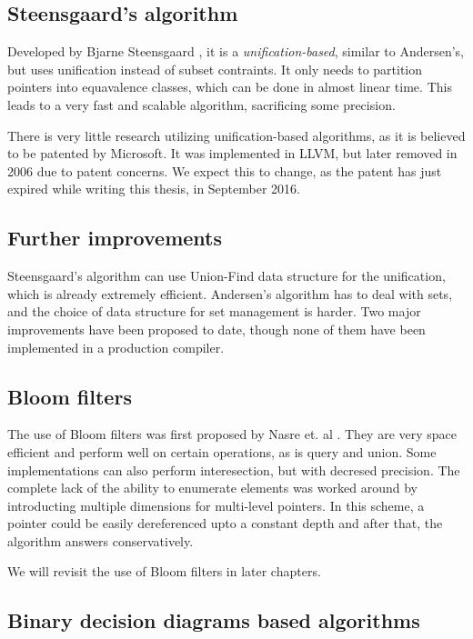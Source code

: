 \subsection{Steensgaard's algorithm}

Developed by Bjarne Steensgaard \cite{Steensgaard96}, it is  a {\it
unification-based}, similar to Andersen's, but uses unification instead of
subset contraints. It only needs to partition pointers into equavalence
classes, which can be done in almost linear time. This leads to a very fast and
scalable algorithm, sacrificing some precision.

There is very little research utilizing unification-based algorithms, as it is
believed to be patented by Microsoft\cite{patent:steensgaard}. It was
implemented in LLVM, but later removed in 2006 \cite{LLVM:DSA:Remove} due to
patent concerns. We expect this to change, as the patent has just expired while
writing this thesis, in September 2016.

\subsection{Further improvements}

Steensgaard's algorithm can use Union-Find data structure for the unification,
which is already extremely efficient. Andersen's algorithm has to deal with
sets, and the choice of data structure for set management is harder. Two major
improvements have been proposed to date, though none of them have been
implemented in a production compiler.

\subsection{Bloom filters}

The use of Bloom filters was first proposed by Nasre et. al \cite{nasre2009}.
They are very space efficient and perform well on certain operations, as is
query and union. Some implementations can also perform interesection, but with
decresed precision. The complete lack of the ability to enumerate elements was
worked around by introducting multiple dimensions for multi-level pointers. In
this scheme, a pointer could be easily dereferenced upto a constant depth and
after that, the algorithm answers conservatively.

We will revisit the use of Bloom filters in later chapters.

\subsection{Binary decision diagrams based algorithms}

